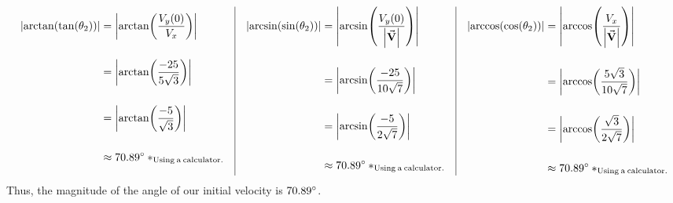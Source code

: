 \documentclass{article}
\begin{document}
{\footnotesize
\[
    \begin{array}{lcl}
        \begin{aligned}[t]
            \abs{\arctan(\tan(\theta_2))} &= \abs{\arctan(\frac{V_y(0)}{V_x})} \\
            \\
            &= \abs{\arctan(\frac{-25}{5\sqrt3})} \\
            \\
            &= \abs{\arctan(\frac{-5}{\sqrt3})} \\
            \\
            &\approx 70.89\degree\:*_\mathrm{Using\:a\:calculator.}
        \end{aligned} 
        \hspace{1em}\vline\hspace{1em}
        \begin{aligned}[t]
            \abs{\arcsin(\sin(\theta_2))} &= \abs{\arcsin(\frac{V_y(0)}{\abs{\va{V}}})} \\
            \\
            &= \abs{\arcsin(\frac{-25}{10\sqrt7})} \\
            \\
            &= \abs{\arcsin(\frac{-5}{2\sqrt7})} \\
            \\
            &\approx 70.89\degree\:*_\mathrm{Using\:a\:calculator.}
        \end{aligned} 
        \hspace{1em}\vline\hspace{1em}
        \begin{aligned}[t]
            \abs{\arccos(\cos(\theta_2))} &= \abs{\arccos(\frac{V_x}{\abs{\va{V}}})} \\
            \\
            &= \abs{\arccos(\frac{5\sqrt3}{10\sqrt7})} \\
            \\
            &= \abs{\arccos(\frac{\sqrt3}{2\sqrt7})} \\
            \\
            &\approx 70.89\degree\:*_\mathrm{Using\:a\:calculator.}
        \end{aligned} 
    \end{array}
\]}
Thus, the magnitude of the angle of our initial velocity is $70.89\degree$.
\end{document}
